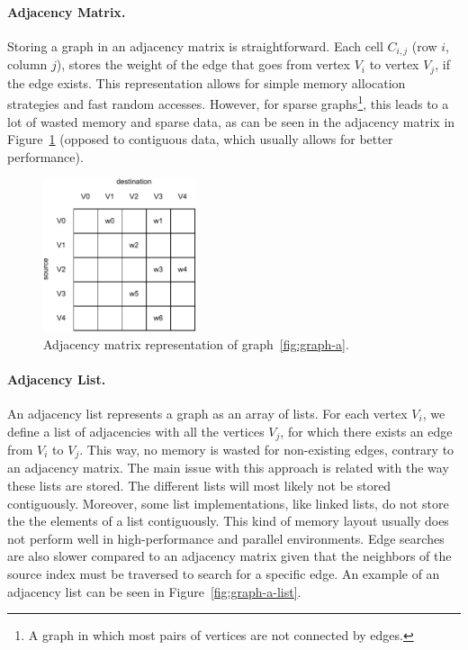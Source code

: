     \paragraph{\textbf{Adjacency Matrix}.} Storing a graph in an adjacency matrix is straightforward. Each cell $C_{i,j}$ (row $i$, column $j$), stores the weight of the edge that goes from vertex $V_i$ to vertex $V_j$, if the edge exists. This representation allows for simple memory allocation strategies and fast random accesses. However, for sparse graphs\footnote{A graph in which most pairs of vertices are not connected by edges.}, this leads to a lot of wasted memory and sparse data, as can be seen in the adjacency matrix in Figure~\ref{fig:graph-a-matrix} (opposed to contiguous data, which usually allows for better performance).


\begin{figure}[tbp]
  \centering
    \includegraphics[width=0.4\textwidth]{Chapters/Figures/Images/graph_a_matrix.pdf}
    \caption{Adjacency matrix representation of graph~\ref{fig:graph-a}.}
\label{fig:graph-a-matrix}
\end{figure}

    \paragraph{\textbf{Adjacency List}.} An adjacency list represents a graph as an array of lists. For each vertex $V_i$, we define a list of adjacencies with all the vertices $V_j$, for which there exists an edge from $V_i$ to $V_j$. This way, no memory is wasted for non-existing edges, contrary to an adjacency matrix. The main issue with this approach is related with the way these lists are stored. The different lists will most likely not be stored contiguously. Moreover, some list implementations, like linked lists, do not store the the elements of a list contiguously. This kind of memory layout usually does not perform well in high-performance and parallel environments. Edge searches are also slower compared to an adjacency matrix given that the neighbors of the source index must be traversed to search for a specific edge. An example of an adjacency list can be seen in Figure~\ref{fig:graph-a-list}.

